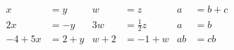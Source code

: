 \begin{align*}
x&=y           &  w &=z              &  a&=b+c\\
2x&=-y         &  3w&=\frac{1}{2}z   &  a&=b\\
-4 + 5x&=2+y   &  w+2&=-1+w          &  ab&=cb
\end{align*}
